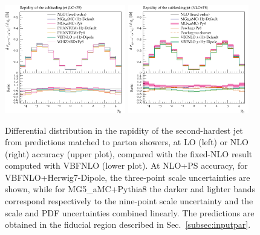 \documentclass[twocolumn,epjc3]{svjour3} %
\newlength{\width}
\begin{document}
\begin{figure}
\centering
\includegraphics[width=0.47\textwidth]{figures/LOPS/y_j2.pdf}
\includegraphics[width=0.47\textwidth]{figures/NLOPS/y_j2.pdf}
\caption{Differential distribution in the
rapidity of the second-hardest jet
from predictions matched to parton showers, at LO (left) or NLO (right) accuracy (upper plot), compared with the fixed-NLO result computed with {\sc VBFNLO} (lower plot). At NLO+PS accuracy, for
    {\sc VBFNLO}+{\sc Herwig7-Dipole}, the three-point scale uncertainties are shown, while for {\sc MG5\_aMC}+{\sc Pythia8} the darker and lighter bands correspond
    respectively to the nine-point scale uncertainty and the scale and PDF uncertainties combined linearly.
    The predictions are obtained in the fiducial region described in Sec.~\ref{subsec:inputpar}.}
\label{fig:PSy2}
\end{figure}
\end{document}
